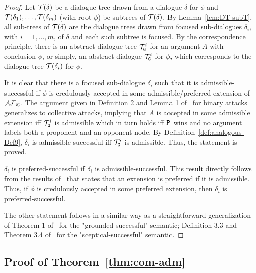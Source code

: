  \begin{proof} 
 Let $\mathcal{T}(\delta)$ be a dialogue tree drawn from a dialogue $\delta$ for $\phi$ and $\mathcal{T}(\delta_1), \ldots , \mathcal{T}(\delta_m)$ (with root $\phi$) be subtrees of $\mathcal{T}(\delta)$. By Lemma~\ref{lem:DT-subT}, all sub-trees of $\mathcal{T}(\delta)$ are the dialogue trees drawn from focused sub-dialogues $\delta_i$, with $i = 1, \ldots, m$, of $\delta$ and each such subtree is focused.
%
 By the correspondence principle, there is an abstract dialogue tree $\mathcal{T}_{\texttt{\textup{G}}}^{i}$ for an argument $A$ with conclusion $\phi$, or simply, an abstract dialogue $\mathcal{T}_{\texttt{\textup{G}}}^{i}$ for $\phi$, which corresponds to the dialogue tree $\mathcal{T}(\delta_i)$ for $\phi$.
 
 It is clear that there is a focused sub-dialogue $\delta_i$  such that it is admissible-successful if $\phi$ is credulously accepted in some admissible/preferred extension of $\mathcal{AF}_ {\mathcal{K}}$.
 The argument given in Definition 2 and Lemma 1 of~\cite{ThangDH09} for binary attacks generalizes to collective attacks, implying that $A$ is accepted in some admissible extension iff $\mathcal{T}_{\texttt{\textup{G}}}^{i}$ is admissible which in turn holds iff $\texttt{\textup{P}}$ wins and no argument labels both a proponent and an opponent node.  By Definition~\ref{def:analogous-Def9}, $\delta_i$ is admissible-successful iff $\mathcal{T}_{\texttt{\textup{G}}}^{i}$ is admissible. Thus, the statement is proved.
 
  $\delta_i$ is preferred-successful if $\delta_i$ is admissible-successful.
  This result directly follows from the results of~\cite{Dung95} that states that an extension is preferred if it is admissible. Thus, if $\phi$ is credulously accepted in some preferred extension, then $\delta_i$ is preferred-successful. 
  
  The other statement follows in a similar way as a straightforward generalization of Theorem 1 of~\cite{ThangDH09} for the "grounded-successful" semantic; Definition 3.3 and Theorem 3.4 of~\cite{DUNG2007642} for the "sceptical-successful" semantic.
\end{proof}



\subsection{Proof of Theorem~\ref{thm:com-adm}}

\compadm*

